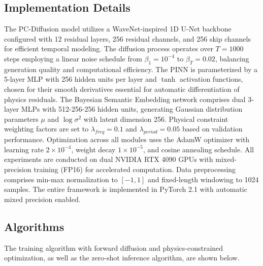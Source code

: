 \subsection{Implementation Details}
The PC-Diffusion model utilizes a WaveNet-inspired 1D U-Net backbone configured with 12 residual layers, 256 residual channels, and 256 skip channels for efficient temporal modeling. The diffusion process operates over $T = 1000$ steps employing a linear noise schedule from $\beta_1 = 10^{-4}$ to $\beta_T = 0.02$, balancing generation quality and computational efficiency. The PINN is parameterized by a 5-layer MLP with 256 hidden units per layer and $\tanh$ activation functions, chosen for their smooth derivatives essential for automatic differentiation of physics residuals. The Bayesian Semantic Embedding network comprises dual 3-layer MLPs with 512-256-256 hidden units, generating Gaussian distribution parameters $\mu$ and $\log \sigma^2$ with latent dimension 256. Physical constraint weighting factors are set to $\lambda_{freq} = 0.1$ and $\lambda_{period} = 0.05$ based on validation performance. Optimization across all modules uses the AdamW optimizer with learning rate $2 \times 10^{-4}$, weight decay $1 \times 10^{-5}$, and cosine annealing schedule. All experiments are conducted on dual NVIDIA RTX 4090 GPUs with mixed-precision training (FP16) for accelerated computation. Data preprocessing comprises min-max normalization to $[-1, 1]$ and fixed-length windowing to 1024 samples. The entire framework is implemented in PyTorch 2.1 with automatic mixed precision enabled.

\subsection{Algorithms}
The training algorithm with forward diffusion and physics-constrained optimization, as well as the zero-shot inference algorithm, are shown below.

